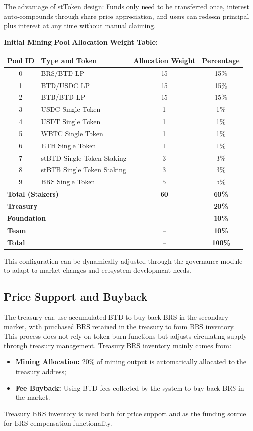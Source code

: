 \documentclass{article}
\begin{document}
The advantage of stToken design: Funds only need to be transferred once, interest auto-compounds through share price appreciation, and users can redeem principal plus interest at any time without manual claiming.

\textbf{Initial Mining Pool Allocation Weight Table:}
\begin{center}
\begin{tabular}{clcc}
\toprule
Pool ID & Type and Token & Allocation Weight & Percentage \\
\midrule
0 & BRS/BTD LP & 15 & 15\% \\
1 & BTD/USDC LP & 15 & 15\% \\
2 & BTB/BTD LP & 15 & 15\% \\
3 & USDC Single Token & 1 & 1\% \\
4 & USDT Single Token & 1 & 1\% \\
5 & WBTC Single Token & 1 & 1\% \\
6 & ETH Single Token & 1 & 1\% \\
7 & stBTD Single Token Staking & 3 & 3\% \\
8 & stBTB Single Token Staking & 3 & 3\% \\
9 & BRS Single Token & 5 & 5\% \\
\midrule
\multicolumn{2}{l}{\textbf{Total (Stakers)}} & \textbf{60} & \textbf{60\%} \\
\multicolumn{2}{l}{\textbf{Treasury}} & -- & \textbf{20\%} \\
\multicolumn{2}{l}{\textbf{Foundation}} & -- & \textbf{10\%} \\
\multicolumn{2}{l}{\textbf{Team}} & -- & \textbf{10\%} \\
\midrule
\multicolumn{2}{l}{\textbf{Total}} & -- & \textbf{100\%} \\
\bottomrule
\end{tabular}
\end{center}

This configuration can be dynamically adjusted through the governance module to adapt to market changes and ecosystem development needs.

\subsection{Price Support and Buyback}
The treasury can use accumulated BTD to buy back BRS in the secondary market, with purchased BRS retained in the treasury to form BRS inventory. This process does not rely on token burn functions but adjusts circulating supply through treasury management. Treasury BRS inventory mainly comes from:
\begin{itemize}
  \item \textbf{Mining Allocation:} 20\% of mining output is automatically allocated to the treasury address;
  \item \textbf{Fee Buyback:} Using BTD fees collected by the system to buy back BRS in the market.
\end{itemize}
Treasury BRS inventory is used both for price support and as the funding source for BRS compensation functionality.
\end{document}
